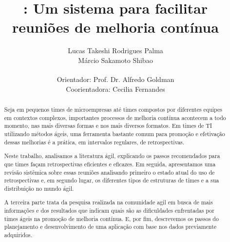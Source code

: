 \documentclass[titlepage, 12pt]{article}
\title{\suricato: Um sistema para facilitar reuniões de melhoria contínua}
\author{Lucas Takeshi Rodrigues Palma\\Márcio Sakamoto Shibao\\ \\Orientador: Prof. Dr. Alfredo Goldman\\Coorientadora: Cecilia Fernandes}
\begin{document}
	

\maketitle

\begin{abstract}
Seja em pequenos times de microempresas até times compostos por diferentes equipes em contextos complexos, importantes processos de melhoria contínua acontecem a todo momento, nas mais diversas formas e nos mais diversos formatos. Em times de TI utilizando métodos ágeis, uma ferramenta bastante comum para promoção e efetivação dessas melhorias é a prática, em intervalos regulares, de retrospectivas.

Neste trabalho, analisamos a literatura ágil, explicando os passos recomendados para que times façam retrospectivas eficientes e eficazes. Em seguida, apresentamos uma revisão sistêmica sobre essas reuniões analisando primeiro o estado atual do uso de retrospectivas e, em segundo lugar, os diferentes tipos de estruturas de times e a sua distribuição no mundo ágil.

A terceira parte trata da pesquisa realizada na comunidade agil em busca de mais informações e dos resultados que indicam quais são as dificuldades enfrentadas por times ágeis na promoção de melhoria contínua. E, por fim, descrevemos os passos do planejamento e desenvolvimento de uma aplicação com base nos dados previamente adquiridos.




\end{abstract}
\newpage
\end{document}
